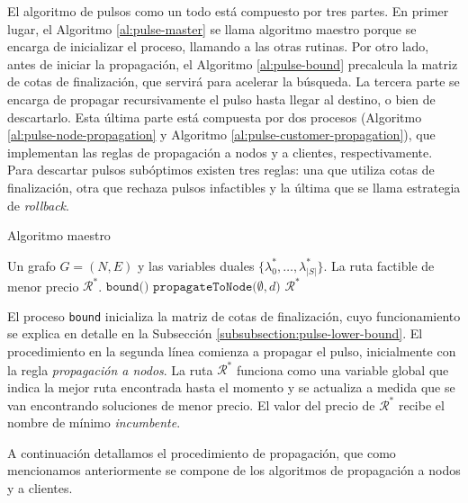 El algoritmo de pulsos como un todo está compuesto por tres partes. En primer lugar, el Algoritmo \ref{al:pulse-master} se llama algoritmo maestro porque se encarga de inicializar el proceso, llamando a las otras rutinas. Por otro lado, antes de iniciar la propagación, el Algoritmo \ref{al:pulse-bound} precalcula la matriz de cotas de finalización, que servirá para acelerar la búsqueda. La tercera parte se encarga de propagar recursivamente el pulso hasta llegar al destino, o bien de descartarlo. Esta última parte está compuesta por dos procesos (Algoritmo \ref{al:pulse-node-propagation} y Algoritmo \ref{al:pulse-customer-propagation}), que implementan las reglas de propagación a nodos y a clientes, respectivamente. Para descartar pulsos subóptimos existen tres reglas: una que utiliza cotas de finalización, otra que rechaza pulsos infactibles y la última que se llama estrategia de \emph{rollback}.

\begin{algorithm}[H]
  \caption{Algoritmo maestro}
  \label{al:pulse-master}
  \begin{algorithmic}[1]
  	\Require Un grafo $G = (N, E)$ y las variables duales $\{\lambda^*_0, \dots, \lambda^*_{|S|}\}$.
  	\Ensure La ruta factible de menor precio $\mathscr{R}^{*}$.
        \State $\texttt{bound()}$
        \State $\texttt{propagateToNode(} \emptyset, d \texttt{)}$
	\Return $\mathscr{R}^{*}$
  \end{algorithmic}
\end{algorithm}

El proceso \texttt{bound} inicializa la matriz de cotas de finalización, cuyo funcionamiento se explica en detalle en la Subsección \ref{subsubsection:pulse-lower-bound}. El procedimiento en la segunda línea comienza a propagar el pulso, inicialmente con la regla \emph{propagación a nodos}. La ruta $\mathscr{R}^{*}$ funciona como una variable global que indica la mejor ruta encontrada hasta el momento y se actualiza a medida que se van encontrando soluciones de menor precio. El valor del precio de $\mathscr{R}^{*}$ recibe el nombre de mínimo \emph{incumbente}. 

A continuación detallamos el procedimiento de propagación, que como mencionamos anteriormente se compone de los algoritmos de propagación a nodos y a clientes. 

